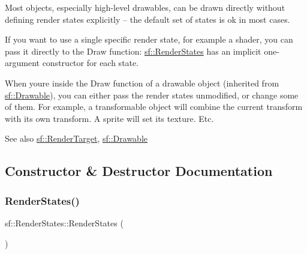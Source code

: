 Most objects, especially high-\/level drawables, can be drawn directly without defining render states explicitly -- the default set of states is ok in most cases. 
\begin{DoxyCode}{0}
\end{DoxyCode}


If you want to use a single specific render state, for example a shader, you can pass it directly to the Draw function\+: \mbox{\hyperlink{classsf_1_1_render_states}{sf\+::\+Render\+States}} has an implicit one-\/argument constructor for each state. 
\begin{DoxyCode}{0}
\end{DoxyCode}


When you\textquotesingle{}re inside the Draw function of a drawable object (inherited from \mbox{\hyperlink{classsf_1_1_drawable}{sf\+::\+Drawable}}), you can either pass the render states unmodified, or change some of them. For example, a transformable object will combine the current transform with its own transform. A sprite will set its texture. Etc.

\begin{DoxySeeAlso}{See also}
\mbox{\hyperlink{classsf_1_1_render_target}{sf\+::\+Render\+Target}}, \mbox{\hyperlink{classsf_1_1_drawable}{sf\+::\+Drawable}} \begin{DoxyVerb}\end{DoxyVerb}
 
\end{DoxySeeAlso}


\subsection{Constructor \& Destructor Documentation}
\mbox{\label{classsf_1_1_render_states_a885bf14070d0d5391f062f62b270b7d0}} 
\subsubsection{\texorpdfstring{RenderStates()}{RenderStates()}\hspace{0.1cm}{\footnotesize\ttfamily [1/6]}}
{\footnotesize\ttfamily sf\+::\+Render\+States\+::\+Render\+States (\begin{DoxyParamCaption}{ }\end{DoxyParamCaption})}



